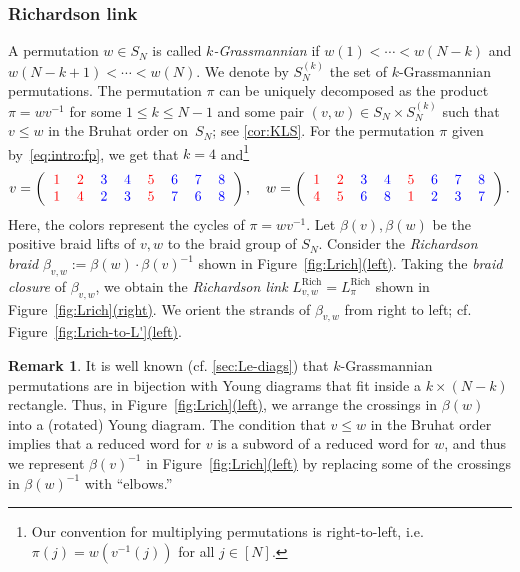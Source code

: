 \documentclass[11pt]{article}
\theoremstyle{definition}
\newtheorem{remark}[theo]{Remark}
\numberwithin{equation}{section}
\newcommand\Sn{S_\n}
\newcommand\Skn{S_\n^{(k)}}
\newcommand\rich{\operatorname{Rich}}
\newcommand\Lrich{L^{\rich}}
\newcommand\fp{\pi}
\def\figref#1(#2){Figure~\hyperref[#1]{\ref*{#1}(#2)}}
\newcommand\n{N}
\begin{document}
\subsubsection{Richardson link}\label{sec:intro:Rich_link} A permutation $w\in\Sn$ is called \emph{$k$-Grassmannian} if $w(1)<\cdots<w(\n-k)$ and $w(\n-k+1)<\cdots<w(\n)$. We denote by $\Skn$ the set of $k$-Grassmannian permutations. The permutation $\fp$ can be uniquely decomposed as the product $\fp=wv^{-1}$ for some $1\leq k\leq \n-1$ and some pair $(v,w)\in \Sn\times\Skn$ such that $v\leq w$ in the Bruhat order on~$\Sn$; see \cref{cor:KLS}. For the permutation $\fp$ given by~\eqref{eq:intro:fp}, we get that $k=4$ and\footnote{Our convention for multiplying permutations is right-to-left, i.e.  $\fp(j)=w(v^{-1}(j))$ for all $j\in[\n]$.}
\begin{equation*}%
v=\left(\!\!\text{
\begin{tabular}{cccccccc}
\textcolor{red}{$1$} & \textcolor{red}{$2$} & \textcolor{blue}{$3$} & \textcolor{blue}{$4$} & \textcolor{red}{$5$} & \textcolor{blue}{$6$} & \textcolor{blue}{$7$} & \textcolor{blue}{$8$}\\
\textcolor{red}{$1$} & \textcolor{red}{$4$} & \textcolor{blue}{$2$} & \textcolor{blue}{$3$} & \textcolor{red}{$5$} & \textcolor{blue}{$7$} & \textcolor{blue}{$6$} & \textcolor{blue}{$8$}
\end{tabular}
}\!\!\right)
,\quad
w=\left(\!\!\text{
\begin{tabular}{cccccccc}
\textcolor{red}{$1$} & \textcolor{red}{$2$} & \textcolor{blue}{$3$} & \textcolor{blue}{$4$} & \textcolor{red}{$5$} & \textcolor{blue}{$6$} & \textcolor{blue}{$7$} & \textcolor{blue}{$8$}\\
\textcolor{red}{$4$} & \textcolor{red}{$5$} & \textcolor{blue}{$6$} & \textcolor{blue}{$8$} & \textcolor{red}{$1$} & \textcolor{blue}{$2$} & \textcolor{blue}{$3$} & \textcolor{blue}{$7$}
\end{tabular}
}\!\!\right)
.
\end{equation*}
%
Here, the colors represent the cycles of $\fp=wv^{-1}$. 
 Let $\beta(v),\beta(w)$ be the positive braid lifts of $v,w$ to the braid group of $\Sn$. Consider the \emph{Richardson braid} $\beta_{v,w}:=\beta(w)\cdot \beta(v)^{-1}$ shown in \figref{fig:Lrich}(left). Taking the \emph{braid closure} of $\beta_{v,w}$, we obtain the \emph{Richardson link} $\Lrich_{v,w}=\Lrich_\fp$ shown in \figref{fig:Lrich}(right). We orient the strands of $\beta_{v,w}$ from right to left; cf. \figref{fig:Lrich-to-L'}(left).
%
\begin{remark}\label{rmk:Rich_Young}
It is well known (cf. \cref{sec:Le-diags}) that $k$-Grassmannian permutations are in bijection with Young diagrams that fit inside a $k\times (\n-k)$ rectangle. Thus, in \figref{fig:Lrich}(left), we arrange the crossings in $\beta(w)$ into a (rotated) Young diagram. The condition that $v\leq w$ in the Bruhat order implies that a reduced word for $v$ is a subword of a reduced word for $w$, and thus we represent $\beta(v)^{-1}$ in \figref{fig:Lrich}(left) by replacing some of the crossings in $\beta(w)^{-1}$ with ``elbows.''
%
\end{remark}
\end{document}
